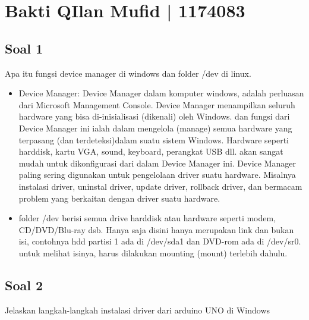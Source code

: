 \section{Bakti QIlan Mufid | 1174083}
\subsection{Soal 1}
Apa itu fungsi device manager di windows dan folder /dev di linux.
\begin{itemize}
	\item Device Manager: Device Manager dalam komputer windows, adalah perluasan dari Microsoft Management Console. Device Manager menampilkan seluruh hardware yang bisa di-inisialisasi (dikenali) oleh Windows. dan fungsi dari Device Manager ini ialah dalam mengelola (manage) semua hardware yang terpasang (dan terdeteksi)dalam suatu sistem Windows. Hardware seperti harddisk, kartu VGA, sound, keyboard, perangkat USB dll. akan sangat mudah untuk dikonfigurasi dari dalam Device Manager ini. Device Manager paling sering digunakan untuk pengelolaan driver suatu hardware. Misalnya instalasi driver, uninstal driver, update driver, rollback driver, dan bermacam problem yang berkaitan dengan driver suatu hardware.
	\item folder /dev berisi semua drive harddisk atau hardware seperti modem, CD/DVD/Blu-ray dsb. Hanya saja disini hanya merupakan link dan bukan isi, contohnya hdd partisi 1 ada di /dev/sda1 dan DVD-rom ada di /dev/sr0. untuk melihat isinya, harus dilakukan mounting (mount) terlebih dahulu.
\end{itemize}

\subsection{Soal 2}

Jelaskan langkah-langkah instalasi driver dari arduino UNO di Windows

